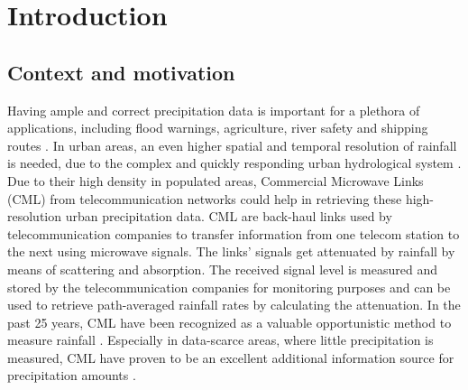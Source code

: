 \documentclass[twocolumn, 10pt, a4paper]{memoir}
\begin{document}
\cleardoublepage

  

\cleardoublepage 

\pagestyle{ruled}
\mainmatter          

\chapter{Introduction}\vspace{-6mm} 
\section{Context and motivation}

Having ample and correct precipitation data is important for a plethora of applications, including flood warnings, agriculture, river safety and shipping routes . In urban areas, an even higher spatial and temporal resolution of rainfall is needed, due to the complex and quickly responding urban hydrological system . Due to their high density in populated areas, Commercial Microwave Links (CML) from telecommunication networks could help in retrieving these high-resolution urban precipitation data. CML are back-haul links used by telecommunication companies to transfer information from one telecom station to the next using microwave signals. The links' signals get attenuated by rainfall by means of scattering and absorption. The received signal level is measured and stored by the telecommunication companies for monitoring purposes and can be used to retrieve path-averaged rainfall rates by calculating the attenuation. In the past 25 years, CML have been recognized as a valuable opportunistic method to measure rainfall . Especially in data-scarce areas, where little precipitation is measured, CML have proven to be an excellent additional information source for precipitation amounts .   
\end{document}
